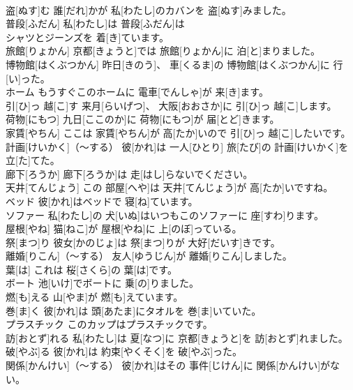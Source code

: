 \documentclass[8pt]{extreport}
\begin{document}
\begin{CJK}{UTF8}{min}
\\	盗[ぬす]む	誰[だれ]かが 私[わたし]のカバンを 盗[ぬす]みました。		
\\	普段[ふだん]	私[わたし]は 普段[ふだん]は
\\	シャツとジーンズを 着[き]ています。		
\\	旅館[りょかん]	京都[きょうと]では 旅館[りょかん]に 泊[と]まりました。		
\\	博物館[はくぶつかん]	昨日[きのう]、 車[くるま]の 博物館[はくぶつかん]に 行[い]った。		
\\	ホーム	もうすぐこのホームに 電車[でんしゃ]が 来[き]ます。		
\\	引[ひ]っ 越[こ]す	来月[らいげつ]、 大阪[おおさか]に 引[ひ]っ 越[こ]します。		
\\	荷物[にもつ]	九日[ここのか]に 荷物[にもつ]が 届[とど]きます。		
\\	家賃[やちん]	ここは 家賃[やちん]が 高[たか]いので 引[ひ]っ 越[こ]したいです。		
\\	計画[けいかく]（～する）	彼[かれ]は 一人[ひとり] 旅[たび]の 計画[けいかく]を 立[た]てた。		
\\	廊下[ろうか]	廊下[ろうか]は 走[はし]らないでください。		
\\	天井[てんじょう]	この 部屋[へや]は 天井[てんじょう]が 高[たか]いですね。		
\\	ベッド	彼[かれ]はベッドで 寝[ね]ています。		
\\	ソファー	私[わたし]の 犬[いぬ]はいつもこのソファーに 座[すわ]ります。		
\\	屋根[やね]	猫[ねこ]が 屋根[やね]に 上[のぼ]っている。		
\\	祭[まつ]り	彼女[かのじょ]は 祭[まつ]りが 大好[だいす]きです。		
\\	離婚[りこん]（～する）	友人[ゆうじん]が 離婚[りこん]しました。		
\\	葉[は]	これは 桜[さくら]の 葉[は]です。		
\\	ボート	池[いけ]でボートに 乗[の]りました。		
\\	燃[も]える	山[やま]が 燃[も]えています。		
\\	巻[ま]く	彼[かれ]は 頭[あたま]にタオルを 巻[ま]いていた。		
\\	プラスチック	このカップはプラスチックです。		
\\	訪[おとず]れる	私[わたし]は 夏[なつ]に 京都[きょうと]を 訪[おとず]れました。		
\\	破[やぶ]る	彼[かれ]は 約束[やくそく]を 破[やぶ]った。		
\\	関係[かんけい]（～する）	彼[かれ]はその 事件[じけん]に 関係[かんけい]がない。		

\end{CJK}
\end{document}
